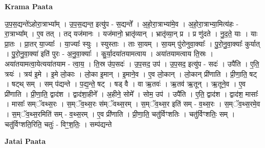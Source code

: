 \documentclass[17pt]{extarticle}
\begin{document}
\textbf{Krama Paata} \newline

उ॒प॒स॒द्यन्ते॑ऽहोरा॒त्राभ्या᳚म् । उ॒प॒स॒द्यन्त॒ इत्यु॑प - स॒द्यन्ते᳚ । अ॒हो॒रा॒त्राभ्या॑मे॒व । अ॒हो॒रा॒त्राभ्या॒मित्य॑हः - रा॒त्राभ्या᳚म् । ए॒व तत् । तद् यज॑मानः । यज॑मानो॒ भ्रातृ॑व्यान् । भ्रातृ॑व्या॒न् प्र । प्र णु॑दते । नु॒द॒ते॒ याः । याः प्रा॒तः । प्रा॒तर् या॒ज्याः᳚ । या॒ज्याः᳚ स्युः । स्युस्ताः । ताः सा॒यम् । सा॒यम् पु॑रोनुवा॒क्याः᳚ । पु॒रो॒नु॒वा॒क्याः᳚ कुर्यात् । पु॒रो॒नु॒वा॒क्या॑ इति॑ पुरः - अ॒नु॒वा॒क्याः᳚ । कु॒र्या॒दया॑तयामत्वाय । अया॑तयामत्वाय ति॒स्रः । अया॑तयामत्वा॒येत्यया॑तयाम - त्वा॒य॒ । ति॒स्र उ॑प॒सदः॑ । उ॒प॒सद॒ उप॑ । उ॒प॒सद॒ इत्यु॑प - सदः॑ । उपै॑ति । ए॒ति॒ त्रयः॑ । त्रय॑ इ॒मे । इ॒मे लो॒काः । लो॒का इ॒मान् । इ॒माने॒व । ए॒व लो॒कान् । लो॒कान् प्री॑णाति । प्री॒णा॒ति॒ षट् । षट्थ् सम् । सम् प॑द्यन्ते । प॒द्य॒न्ते॒ षट् । षड् वै । वा ऋ॒तवः॑ । ऋ॒तव॑ ऋ॒तून् । ऋ॒तूने॒व । ए॒व प्री॑णाति । प्री॒णा॒ति॒ द्वाद॑श । द्वाद॑शा॒हीने᳚ । अ॒हीने॒ सोमे᳚ । सोम॒ उप॑ । उपै॑ति । ए॒ति॒ द्वाद॑श । द्वाद॑श॒ मासाः᳚ । मासाः᳚ सम्ॅवथ्स॒रः । स॒म्ॅव॒थ्स॒रः स॑म्ॅवथ्स॒रम् । स॒म्ॅव॒थ्स॒र इति॑ सम् - व॒थ्स॒रः । स॒म्ॅव॒थ्स॒रमे॒व । स॒म्ॅव॒थ्स॒रमिति॑ सम् - व॒थ्स॒रम् । ए॒व प्री॑णाति । प्री॒णा॒ति॒ चतु॑र्विꣳशतिः । चतु॑र्विꣳशतिः॒ सम् । चतु॑र्विꣳशति॒रिति॒ चतुः॑ - विꣳ॒॒श॒तिः॒ । सम्प॑द्यन्ते \newline

\textbf{Jatai Paata} \newline
\end{document}
